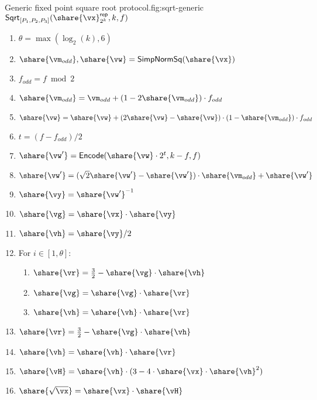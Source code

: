 \begin{Boxfig}{Generic fixed point square root protocol.}{fig:sqrt-generic}
  {$\mathsf{Sqrt}_{[P_1, P_2, P_3]}(\share{\vx}^\mathsf{rep}_{2^k}, k, f)$}
  \begin{enumerate}
    \item $\theta = \max(\log_2(k), 6)$
    \item $\share{\vm_{odd}}, \share{\vw} = \mathsf{SimpNormSq}(\share{\vx})$
    \item $f_{odd} = f \bmod 2$
    \item $\share{\vm_{odd}} = \vm_{odd} + (1 - 2 \share{\vm_{odd}}) \cdot f_{odd}$
    \item $\share{\vw} = \share{\vw} + (2 \share{\vw} - \share{\vw}) \cdot (1 - \share{\vm_{odd}}) \cdot f_{odd}$
    \item $t = (f - f_{odd}) / 2$
    \item $\share{\vw'} = \mathsf{Encode}(\share{\vw} \cdot 2^t, k-f, f)$
    \item $\share{\vw'} = (\sqrt{2} \share{\vw'} - \share{\vw'}) \cdot \share{\vm_{odd}} + \share{\vw'}$
    \item $\share{\vy} = \share{\vw'}^{-1}$
    \item $\share{\vg} = \share{\vx} \cdot \share{\vy}$
    \item $\share{\vh} = \share{\vy} / 2$
    \item For $i \in [1, \theta]$:
    \begin{enumerate}
      \item $\share{\vr} = \frac{3}{2} - \share{\vg} \cdot \share{\vh}$
      \item $\share{\vg} = \share{\vg} \cdot \share{\vr}$
      \item $\share{\vh} = \share{\vh} \cdot \share{\vr}$
    \end{enumerate}
    \item $\share{\vr} = \frac{3}{2} - \share{\vg} \cdot \share{\vh}$
    \item $\share{\vh} = \share{\vh} \cdot \share{\vr}$
    \item $\share{\vH} = \share{\vh} \cdot (3 - 4 \cdot \share{\vx} \cdot \share{\vh}^2)$
    \item $\share{\sqrt{\vx}} = \share{\vx} \cdot \share{\vH}$
  \end{enumerate}
\end{Boxfig}